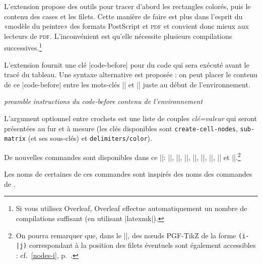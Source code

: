 \documentclass[dvipsnames]{article}
\begin{document}
L'extension  propose des outils pour tracer d'abord les
rectangles colorés, puis le contenu des cases et les filets. Cette manière de
faire est plus dans l'esprit du «modèle du peintre» des formats PostScript et
\textsc{pdf} et convient donc mieux aux lecteurs de \textsc{pdf}. L'inconvénient
est qu'elle nécessite plusieurs compilations successives.\footnote{Si vous
  utilisez Overleaf, Overleaf effectue automatiquement un nombre de compilations
  suffisant (en utilisant |latexmk|).}

\medskip
L'extension  fournit une clé |code-before| pour du code qui sera
exécuté avant le tracé du tableau. Une syntaxe alternative est proposée : on
peut placer le contenu de ce |code-before| entre les mots-clés |\CodeBefore| et
|\Body| juste au début de l'environnement.

\smallskip
\begin{Code}
\begin{pNiceArray}{\textsl{preamble}}
\emph{}
  \textsl{instructions du code-before}
\emph{\Body}
  \textsl{contenu de l’environnement}
\end{pNiceArray}
\end{Code}

\smallskip
L'argument optionnel entre crochets est une liste de couples \textsl{clé=valeur}
qui seront présentées au fur et à mesure (les clés disponibles sont
  \texttt{create-cell-nodes}, \texttt{sub-matrix} (et ses sous-clés) et
  \texttt{delimiters/color}).

\smallskip
De nouvelles commandes sont disponibles dans ce |\CodeBefore|: |\cellcolor|,
|\rectanglecolor|, |\rowcolor|, |\columncolor|, |\rowcolors|, |\rowlistcolors|,
|\chessboardcolors| et |\arraycolor|.\footnote{On pourra remarquer que, dans le
  |\CodeBefore|, des nœuds PGF-TikZ de la forme \verb+(i-|j)+ correspondant à la
  position des filets éventuels sont également accessibles : cf.~\ref{nodes-i},
  p.~\pageref{nodes-i}.}

Les noms de certaines de ces commandes sont inspirés des noms des commandes de
.

\label{code-before}
\end{document}
